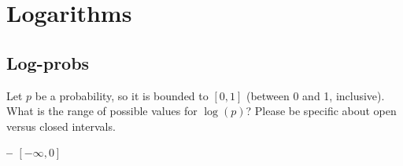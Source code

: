 \documentclass[11pt,letterpaper]{article}
\theoremstyle{definition}
\begin{document}
%
%
%
%

\section{Logarithms}

\subsection{Log-probs}
Let $p$ be a probability, so it is bounded to $[0,1]$ (between 0 and 1, inclusive).
What is the range of possible values for $\log(p)$?  Please be specific about open versus closed intervals.

\textbf{ -- $[-\infty, 0]$}
\end{document}
